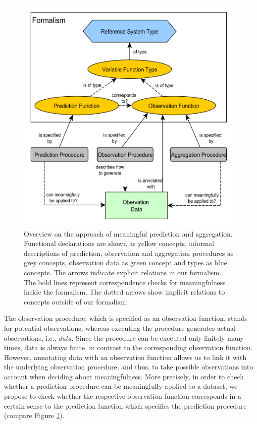 \documentclass[final,authoryear,1p,times]{elsarticle}
\begin{document}
\begin{figure}[ht]
	\centering
		\includegraphics[scale=0.65]{overview.png}
	\caption{Overview on the approach of meaningful prediction and aggregation. Functional declarations are shown as yellow concepts, informal descriptions of prediction, observation and aggregation procedures as grey concepts, observation data as green concept and types as blue concepts. The arrows indicate explicit relations in our formalism. The bold lines represent correspondence checks for meaningfulness inside the formalism. The dotted arrows show implicit relations to concepts outside of our formalism.}
	\label{fig:overview}
\end{figure}

The observation procedure, which is specified as an observation function, stands for potential observations, whereas executing the procedure generates actual observations, i.e., \textit{data}. Since the procedure can be executed only finitely many times, data is always finite, in contrast to the corresponding observation function. However, annotating data with an observation function allows us to link it with the underlying observation procedure, and thus, to take possible observations into account when deciding about meaningfulness. More precisely, in order to check whether a prediction procedure can be meaningfully applied to a dataset, we propose to check whether the respective observation function corresponds in a certain sense to the prediction function which specifies the prediction procedure (compare Figure \ref{fig:overview}). 
\end{document}
